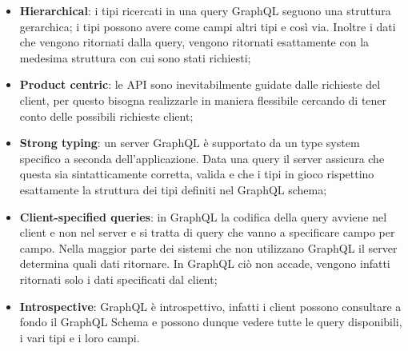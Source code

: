 \begin{itemize}
  \item \textbf{Hierarchical}: i tipi ricercati in una query GraphQL seguono una struttura gerarchica; i tipi possono avere come campi altri tipi e così via. Inoltre i dati che vengono ritornati dalla query, vengono ritornati esattamente con la medesima struttura con cui sono stati richiesti;
  \item \textbf{Product centric}: le API sono inevitabilmente guidate dalle richieste del client, per questo bisogna realizzarle in maniera flessibile cercando di tener conto delle possibili richieste client;
  \item \textbf{Strong typing}: un server GraphQL è supportato da un type system specifico a seconda dell'applicazione. Data una query il server assicura che questa sia sintatticamente corretta, valida e che i tipi in gioco rispettino esattamente la struttura dei tipi definiti nel GraphQL schema;
  \item \textbf{Client-specified queries}: in GraphQL la codifica della query avviene nel client e non nel server e si tratta di query che vanno a specificare campo per campo. Nella maggior parte dei sistemi che non utilizzano GraphQL il server determina quali dati ritornare. In GraphQL ciò non accade, vengono infatti ritornati solo i dati specificati dal client;
  \item \textbf{Introspective}: GraphQL è introspettivo, infatti i client possono consultare a fondo il GraphQL Schema e possono dunque vedere tutte le query disponibili, i vari tipi e i loro campi.
\end{itemize}
